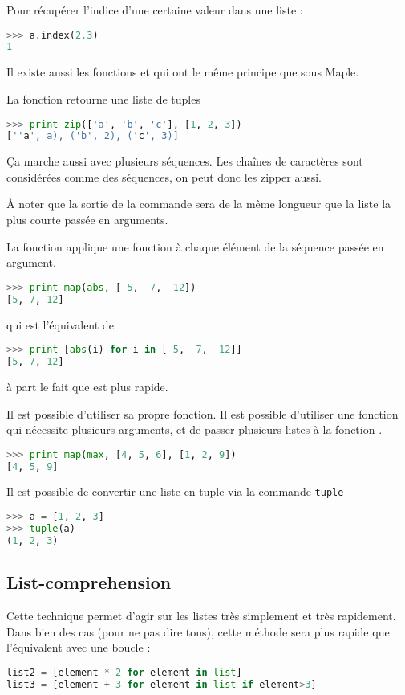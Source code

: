 \documentclass[a4paper,twoside]{article}
\begin{document}
Pour récupérer l'indice d'une certaine valeur dans une liste :
\begin{lstlisting}[language=python]
>>> a.index(2.3)
1
\end{lstlisting}


\bigskip

Il existe aussi les fonctions  et  qui ont le même principe que sous Maple.

La fonction  retourne une liste de tuples
\begin{lstlisting}[language=python]
>>> print zip(['a', 'b', 'c'], [1, 2, 3])
[''a', a), ('b', 2), ('c', 3)]
\end{lstlisting}

\begin{remarque}
Ça marche aussi avec plusieurs séquences. Les chaînes de caractères sont considérées comme des séquences, on peut donc les zipper aussi.

À noter que la sortie de la commande sera de la même longueur que la liste la plus courte passée en arguments.
\end{remarque}

La fonction  applique une fonction à chaque élément de la séquence passée en argument.

\begin{lstlisting}[language=python]
>>> print map(abs, [-5, -7, -12])
[5, 7, 12]
\end{lstlisting}
qui est l'équivalent de
\begin{lstlisting}[language=python]
>>> print [abs(i) for i in [-5, -7, -12]]
[5, 7, 12]
\end{lstlisting}
à part le fait que  est plus rapide.

Il est possible d'utiliser sa propre fonction. Il est possible d'utiliser une fonction qui nécessite plusieurs arguments, et de passer plusieurs listes à la fonction .
\begin{lstlisting}[language=python]
>>> print map(max, [4, 5, 6], [1, 2, 9])
[4, 5, 9]
\end{lstlisting}

\bigskip

Il est possible de convertir une liste en tuple via la commande \texttt{tuple}
\begin{lstlisting}[language=python]
>>> a = [1, 2, 3]
>>> tuple(a)
(1, 2, 3)
\end{lstlisting}


\subsection{List-comprehension}
Cette technique permet d'agir sur les listes très simplement et très rapidement. Dans bien des cas (pour ne pas dire tous), cette méthode sera plus rapide que l'équivalent avec une boucle :
\begin{lstlisting}[language=python]
list2 = [element * 2 for element in list]
list3 = [element + 3 for element in list if element>3]
\end{lstlisting}
\end{document}
